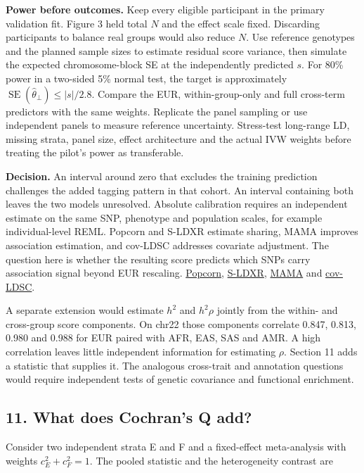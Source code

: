 \documentclass[11pt,a4paper]{article}
\let\reportsection\subsection
\newif\ifinsupplement
\renewcommand{\subsection}[1]{\clearpage
  \ifstrequal{#1}{Supplementary Methods}{\insupplementtrue
    \fancyhead[R]{\small\sffamily Supplementary methods}}{}
  \reportsection{#1}}
\begin{document}
\textbf{Power before outcomes.} Keep every eligible participant in the primary validation fit. Figure 3 held total \(N\) and the effect scale fixed. Discarding participants to balance real groups would also reduce \(N\). Use reference genotypes and the planned sample sizes to estimate residual score variance, then simulate the expected chromosome-block SE at the independently predicted \(s\). For 80\% power in a two-sided 5\% normal test, the target is approximately \(\operatorname{SE}(\hat\theta_\perp)\leq |s|/2.8\). Compare the EUR, within-group-only and full cross-term predictors with the same weights. Replicate the panel sampling or use independent panels to measure reference uncertainty. Stress-test long-range LD, missing strata, panel size, effect architecture and the actual IVW weights before treating the pilot's power as transferable.

\textbf{Decision.} An interval around zero that excludes the training prediction challenges the added tagging pattern in that cohort. An interval containing both leaves the two models unresolved. Absolute calibration requires an independent estimate on the same SNP, phenotype and population scales, for example individual-level REML. Popcorn and S-LDXR estimate sharing, MAMA improves association estimation, and cov-LDSC addresses covariate adjustment. The question here is whether the resulting score predicts which SNPs carry association signal beyond EUR rescaling. \href{https://doi.org/10.1016/j.ajhg.2016.05.001}{Popcorn}, \href{https://pmc.ncbi.nlm.nih.gov/articles/PMC7889654/}{S-LDXR}, \href{https://github.com/JonJala/mama}{MAMA} and \href{https://pubmed.ncbi.nlm.nih.gov/33987664/}{cov-LDSC}.

A separate extension would estimate \(h^2\) and \(h^2\rho\) jointly from the within- and cross-group score components. On chr22 those components correlate 0.847, 0.813, 0.980 and 0.988 for EUR paired with AFR, EAS, SAS and AMR. A high correlation leaves little independent information for estimating \(\rho\). Section 11 adds a statistic that supplies it. The analogous cross-trait and annotation questions would require independent tests of genetic covariance and functional enrichment.

\subsection{11. What does Cochran's Q add?}\label{11-what-does-cochrans-q-add}

Consider two independent strata E and F and a fixed-effect meta-analysis with weights \(c_E^2+c_F^2=1\). The pooled statistic and the heterogeneity contrast are
\end{document}
